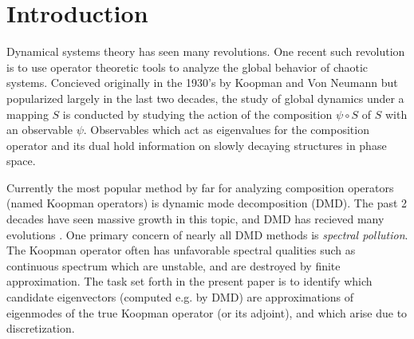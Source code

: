 
\section{Introduction}

Dynamical systems theory has seen many revolutions. One recent such revolution is to use 
operator theoretic tools to analyze the global behavior of chaotic systems. Concieved 
originally in the 1930's by Koopman and Von Neumann \cite{KoopmanOG} but popularized 
largely in the last two decades, the study of global dynamics under a mapping $S$ is 
conducted by studying the action of the composition $\psi \circ S$ of $S$ with an 
observable $\psi$. Observables which act as eigenvalues for the composition operator and 
its dual hold information on slowly decaying structures in phase space. 

Currently the most popular method by far for analyzing composition operators (named Koopman 
operators) is dynamic mode decomposition (DMD). The past 2 decades have seen massive growth 
in this topic, and DMD has recieved many evolutions \cite{DMDmultiverse}. One primary 
concern of nearly all DMD methods is \emph{spectral pollution}. The Koopman operator often 
has unfavorable spectral qualities such as continuous spectrum which are unstable, and are 
destroyed by finite approximation. The task set forth in the present paper is to identify 
which candidate eigenvectors (computed e.g. by DMD) are approximations of eigenmodes of 
the true Koopman operator (or its adjoint), and which arise due to discretization. 

